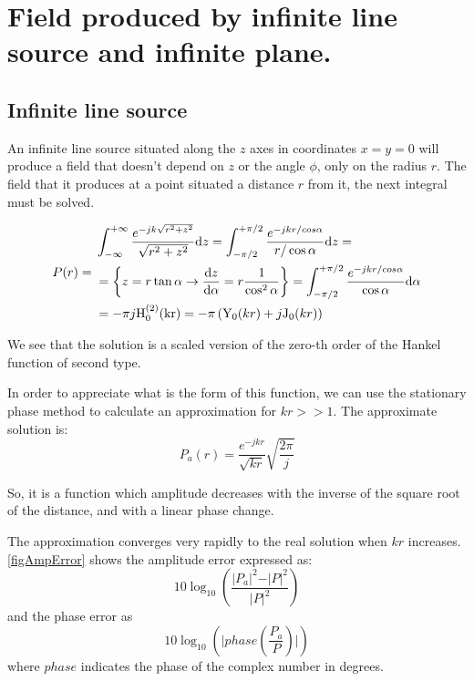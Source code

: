 \chapter{Field produced by infinite line source and infinite plane.}

\section{Infinite line source}

An infinite line source situated along the $z$ axes in coordinates $x = y = 0$ will produce a field that doesn't depend on $z$ or the angle $\phi$, only on the radius $r$. The field that it produces at a point situated a distance $r$ from it, the next integral must be solved.

\begin{equation}
P(r) = \begin{aligned}
&\int_{-\infty}^{+\infty} \frac{e^{-j k \sqrt{r^2 + z^2}}}{\sqrt{r^2 + z^2}} \mathrm{d}z = 
\int_{-\pi/2}^{+\pi/2} \frac{e^{-j k r/cos{\alpha}}}{r/\cos{\alpha}} \mathrm{d}z = \\
&= \left\{ z = r \tan{\alpha} \rightarrow \dv{z}{\alpha} = r\frac{1}{\cos^2{\alpha}} \right\} = \int_{-\pi/2}^{+\pi/2} \frac{e^{-j k r/cos{\alpha}}}{\cos{\alpha}} \mathrm{d}\alpha \\
&= -\pi j \mathrm{H_0^{(2)}(k r)} = -\pi \left( \mathrm{Y}_0(k r) + j\mathrm{J}_0(k r)\right)
\end{aligned}
\end{equation}

We see that the solution is a scaled version of the zero-th order of the Hankel function of second type.

In order to appreciate what is the form of this function, we can use the stationary phase method to calculate an approximation for $kr >> 1$. The approximate solution is:
\begin{equation}
P_{a}(r) = \frac{e^{-jkr}}{\sqrt{kr}}\sqrt{\frac{2\pi}{j}}
\end{equation}

So, it is a function which amplitude decreases with the inverse of the square root of the distance, and with a linear phase change.

The approximation converges very rapidly to the real solution when $kr$ increases. \autoref{figAmpError} shows the amplitude error expressed as:
\begin{equation}
	10 \log_{10} \left( \frac{\vert P_a \vert^2 - \vert P \vert^2}{\vert P \vert^2} \right)
\end{equation}
and the phase error as
\begin{equation}
	10 \log_{10} \left( \vert phase\left(\frac{P_a}{P}\right) \vert \right)
\end{equation}
where $phase$ indicates the phase of the complex number in degrees.

